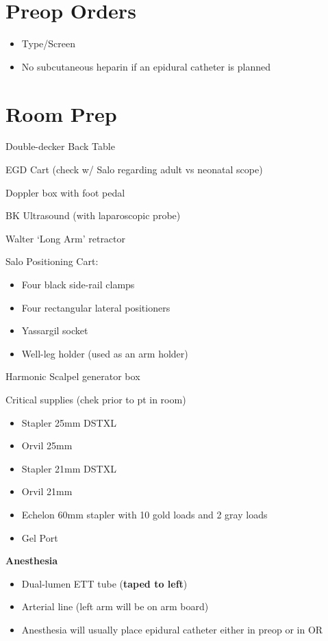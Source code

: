 \documentclass[
  letterpaper,
]{scrbook}
\providecommand{\tightlist}{%
  \setlength{\itemsep}{0pt}\setlength{\parskip}{0pt}}
\begin{document}
\section{Preop Orders}\label{preop-orders}

\begin{itemize}
\tightlist
\item
  Type/Screen
\item
  No subcutaneous heparin if an epidural catheter is planned
\end{itemize}

\section{Room Prep}\label{room-prep}

Double-decker Back Table

EGD Cart (check w/ Salo regarding adult vs neonatal scope)

Doppler box with foot pedal

BK Ultrasound (with laparoscopic probe)

Walter `Long Arm' retractor

Salo Positioning Cart:

\begin{itemize}
\tightlist
\item
  Four black side-rail clamps
\item
  Four rectangular lateral positioners
\item
  Yassargil socket
\item
  Well-leg holder (used as an arm holder)
\end{itemize}

Harmonic Scalpel generator box

Critical supplies (chek prior to pt in room)

\begin{itemize}
\tightlist
\item
  Stapler 25mm DSTXL
\item
  Orvil 25mm
\item
  Stapler 21mm DSTXL
\item
  Orvil 21mm
\item
  Echelon 60mm stapler with 10 gold loads and 2 gray loads
\item
  Gel Port
\end{itemize}

\newpage

\textbf{Anesthesia}

\begin{itemize}
\tightlist
\item
  Dual-lumen ETT tube (\textbf{taped to left})
\item
  Arterial line (left arm will be on arm board)
\item
  Anesthesia will usually place epidural catheter either in preop or in
  OR
\end{itemize}
\end{document}
